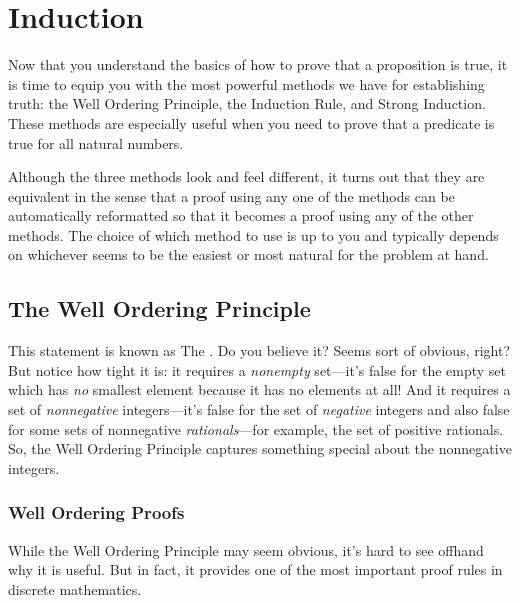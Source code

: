 \chapter{Induction}\label{induction_chap}

Now that you understand the basics of how to prove that a proposition
is true, it is time to equip you with the most powerful methods we
have for establishing truth: the Well Ordering Principle, the
Induction Rule, and Strong Induction.  These methods are especially
useful when you need to prove that a predicate is true for all natural
numbers.

Although the three methods look and feel different, it turns out that
they are equivalent in the sense that a proof using any one of the
methods can be automatically reformatted so that it becomes a proof
using any of the other methods.
The
choice of which method to use is up to you and typically depends on
whichever seems to be the easiest
or most natural for the problem at hand.

\section{The Well Ordering Principle}\label{well_ordering_sec}


This statement is known as The .  Do you
believe it?  Seems sort of obvious, right?  But notice how tight it is: it
requires a \emph{nonempty} set---it's false for the empty set which has
\emph{no} smallest element because it has no elements at all!  And it
requires a set of \emph{nonnegative} integers---it's false for the set of
\emph{negative} integers and also false for some sets of nonnegative
\emph{rationals}---for example, the set of positive rationals.  So, the
Well Ordering Principle captures something special about the nonnegative
integers.

\subsection{Well Ordering Proofs}\label{sec:WOproofs}

While the Well Ordering Principle may seem obvious, it's hard to see offhand why it
is useful.  But in fact, it provides one of the most important proof rules
in discrete mathematics.  

